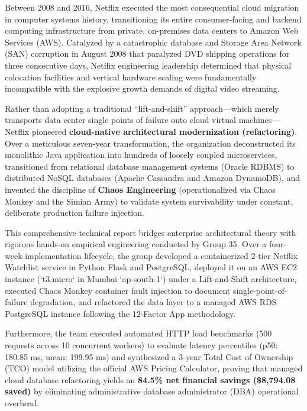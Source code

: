 \documentclass[11pt,a4paper]{article}
\begin{document}
Between 2008 and 2016, Netflix executed the most consequential cloud migration in computer systems history, transitioning its entire consumer-facing and backend computing infrastructure from private, on-premises data centers to Amazon Web Services (AWS). Catalyzed by a catastrophic database and Storage Area Network (SAN) corruption in August 2008 that paralyzed DVD shipping operations for three consecutive days, Netflix engineering leadership determined that physical colocation facilities and vertical hardware scaling were fundamentally incompatible with the explosive growth demands of digital video streaming.

Rather than adopting a traditional ``lift-and-shift'' approach---which merely transports data center single points of failure onto cloud virtual machines---Netflix pioneered \textbf{cloud-native architectural modernization (refactoring)}. Over a meticulous seven-year transformation, the organization deconstructed its monolithic Java application into hundreds of loosely coupled microservices, transitioned from relational database management systems (Oracle RDBMS) to distributed NoSQL databases (Apache Cassandra and Amazon DynamoDB), and invented the discipline of \textbf{Chaos Engineering} (operationalized via Chaos Monkey and the Simian Army) to validate system survivability under constant, deliberate production failure injection.

This comprehensive technical report bridges enterprise architectural theory with rigorous hands-on empirical engineering conducted by Group 35. Over a four-week implementation lifecycle, the group developed a containerized 2-tier Netflix Watchlist service in Python Flask and PostgreSQL, deployed it on an AWS EC2 instance (`t3.micro` in Mumbai `ap-south-1`) under a Lift-and-Shift architecture, executed Chaos Monkey container fault injection to document single-point-of-failure degradation, and refactored the data layer to a managed AWS RDS PostgreSQL instance following the 12-Factor App methodology. 

Furthermore, the team executed automated HTTP load benchmarks (500 requests across 10 concurrent workers) to evaluate latency percentiles (p50: 180.85 ms, mean: 199.95 ms) and synthesized a 3-year Total Cost of Ownership (TCO) model utilizing the official AWS Pricing Calculator, proving that managed cloud database refactoring yields an \textbf{84.5\% net financial savings (\$8,794.08 saved)} by eliminating administrative database administrator (DBA) operational overhead.
\end{document}
